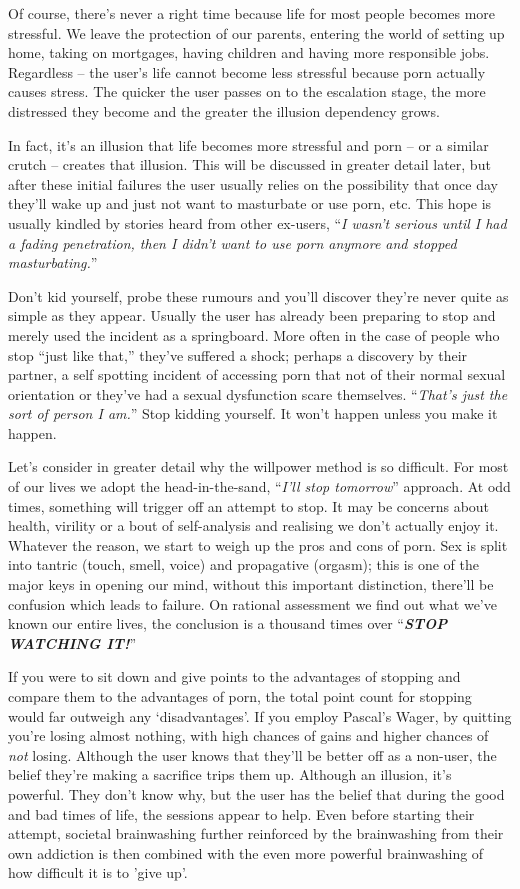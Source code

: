 \documentclass[
]{book}
\begin{document}
Of course, there's never a right time because life for most people becomes more stressful. We leave the protection of our parents, entering the world of setting up home, taking on mortgages, having children and having more responsible jobs. Regardless -- the user's life cannot become less stressful because porn actually causes stress. The quicker the user passes on to the escalation stage, the more distressed they become and the greater the illusion dependency grows.

In fact, it's an illusion that life becomes more stressful and porn -- or a similar crutch -- creates that illusion. This will be discussed in greater detail later, but after these initial failures the user usually relies on the possibility that once day they'll wake up and just not want to masturbate or use porn, etc. This hope is usually kindled by stories heard from other ex-users, ``\emph{I wasn't serious until I had a fading penetration, then I didn't want to use porn anymore and stopped masturbating.}''

Don't kid yourself, probe these rumours and you'll discover they're never quite as simple as they appear. Usually the user has already been preparing to stop and merely used the incident as a springboard. More often in the case of people who stop ``just like that,'' they've suffered a shock; perhaps a discovery by their partner, a self spotting incident of accessing porn that not of their normal sexual orientation or they've had a sexual dysfunction scare themselves. ``\emph{That's just the sort of person I am.}'' Stop kidding yourself. It won't happen unless you make it happen.

Let's consider in greater detail why the willpower method is so difficult. For most of our lives we adopt the head-in-the-sand, ``\emph{I'll stop tomorrow}'' approach. At odd times, something will trigger off an attempt to stop. It may be concerns about health, virility or a bout of self-analysis and realising we don't actually enjoy it. Whatever the reason, we start to weigh up the pros and cons of porn. Sex is split into tantric (touch, smell, voice) and propagative (orgasm); this is one of the major keys in opening our mind, without this important distinction, there'll be confusion which leads to failure. On rational assessment we find out what we've known our entire lives, the conclusion is a thousand times over ``\textbf{\emph{STOP WATCHING IT!}}''

If you were to sit down and give points to the advantages of stopping and compare them to the advantages of porn, the total point count for stopping would far outweigh any `disadvantages'. If you employ Pascal's Wager, by quitting you're losing almost nothing, with high chances of gains and higher chances of \emph{not} losing. Although the user knows that they'll be better off as a non-user, the belief they're making a sacrifice trips them up. Although an illusion, it's powerful. They don't know why, but the user has the belief that during the good and bad times of life, the sessions appear to help. Even before starting their attempt, societal brainwashing further reinforced by the brainwashing from their own addiction is then combined with the even more powerful brainwashing of how difficult it is to 'give up'.
\end{document}
